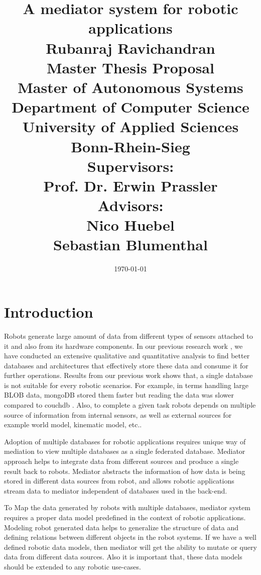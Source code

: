 \documentclass[12pt]{article}
\begin{document}
\title{\Large A mediator system for robotic applications\\
[6mm]
\Large Rubanraj Ravichandran\\
[12mm]
\Large Master Thesis Proposal\\
\small Master of Autonomous Systems\\
[12mm]
\Large Department of Computer Science\\
University of Applied Sciences Bonn-Rhein-Sieg\\
[12mm]
\Large Supervisors:\\
Prof. Dr. Erwin Prassler\\
\Large Advisors:\\
Nico Huebel\\
Sebastian Blumenthal
}
\date{\today}
\maketitle
\newpage
\section{Introduction}

Robots generate large amount of data from different types of sensors attached to it and also from its hardware components. In our previous research work \cite{ravichandranworkbench}, we have conducted an extensive qualitative and quantitative analysis to find better databases and architectures that effectively store these data and consume it for further operations. Results from our previous work shows that, a single database is not suitable for every robotic scenarios. For example, in terms handling large BLOB data, mongoDB stored them faster but reading the data was slower compared to couchdb \cite{ravichandranworkbench}. Also, to complete a given task robots depends on multiple source of information from internal sensors, as well as external sources for example world model, kinematic model, etc.. 

Adoption of multiple databases for robotic applications requires unique way of mediation to view multiple databases as a single federated database. Mediator approach helps to integrate data from different sources and produce a single result back to robots. Mediator abstracts the information of how data is being stored in different data sources from robot, and allows robotic applications stream data to mediator independent of databases used in the back-end.

To Map the data generated by robots with multiple databases, mediator system requires a proper data model predefined in the context of robotic applications. Modeling robot generated data helps to generalize the structure of data and defining relations between different objects in the robot systems. If we have a well defined robotic data models, then mediator will get the ability to mutate or query data from different data sources. Also it is important that, these data models should be extended to any robotic use-cases.
\end{document}
